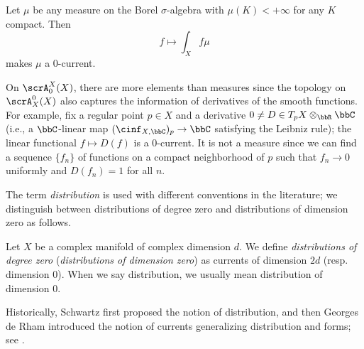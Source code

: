 \begin{example}[label=\labelNFM{eg:measure-as-currents-of-dimension-zero}, status=draft, tag=0000000, title={Currents of dimension zero}]
	Let $\mu$ be any measure on the Borel $\sigma$-algebra with $\mu(K) < +\infty$ for any $K$ compact.
	Then
	\[ f \mapsto \int_X f \mu \]
	makes $\mu$ a $0$-current.

	On $\scrA_{0}^X(X)$, there are more elements than measures since the topology on $\scrA_X^0(X)$ also captures the information of derivatives of the smooth functions.
	For example, fix a regular point $p \in X$ and a derivative $0 \neq D \in T_pX \otimes _\bbR \bbC$ (i.e., a $\bbC$-linear map $(\cinf_{X,\bbC})_p \to \bbC$ satisfying the Leibniz rule); the linear functional $f \mapsto D(f)$ is a $0$-current.
	It is not a measure since we can find a sequence $\{f_n\}$ of functions on a compact neighborhood of $p$ such that $f_n \to 0$ uniformly and $D(f_n) = 1$ for all $n$.

\end{example}

The term \emph{distribution} is used with different conventions in the literature;
we distinguish between distributions of degree zero and distributions of dimension zero as follows.

\begin{definition}[label=\labelNFM{def:distribution-of-degree-and-dimension-0}, status=draft, tag=0000000]
	Let $X$ be a complex manifold of complex dimension $d$.
	We define \emph{distributions of degree zero} (\emph{distributions of dimension zero}) as currents of dimension $2d$ (resp. dimension $0$).
	When we say distribution, we usually mean distribution of dimension $0$.
\end{definition}

Historically, Schwartz first proposed the notion of distribution, and then Georges de Rham introduced the notion of currents generalizing distribution and forms; see \cite{Dinh-Sibony-2005-IntroductionTheoryCurrents}.

